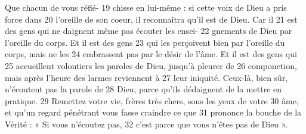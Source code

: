 Que chacun de vous réflé-	 
19	 	chisse en lui-même : si cette voix de Dieu a pris force dans	 
20	 	l'oreille de son coeur, il reconnaîtra qu'il est de Dieu. Car il	 
21	 	est des gens qui ne daignent même pas écouter les ensei-	 
22	 	gnements de Dieu par l'oreille du corps. Et il est des gens	 
23	 	qui les perçoivent bien par l'oreille du corps, mais ne les	 
24	 	embrassent pas par le désir de l'âme. Et il est des gens qui	 
25	 	accueillent volontiers les paroles de Dieu, jusqu'à pleurer de	 
26	 	componction, mais après l'heure des larmes reviennent à	 
27	 	leur iniquité. Ceux-là, bien sûr, n'écoutent pas la parole de	 
28	 	Dieu, parce qu'ils dédaignent de la mettre en pratique.	 
29	 	Remettez votre vie, frères très chers, sous les yeux de votre	 
30	 	âme, et qu'un regard pénétrant vous fasse craindre ce que	 
31	 	prononce la bouche de la Vérité : « Si vous n'écoutez pas,	 
32	 	c'est parce que vous n'êtes pas de Dieu ».